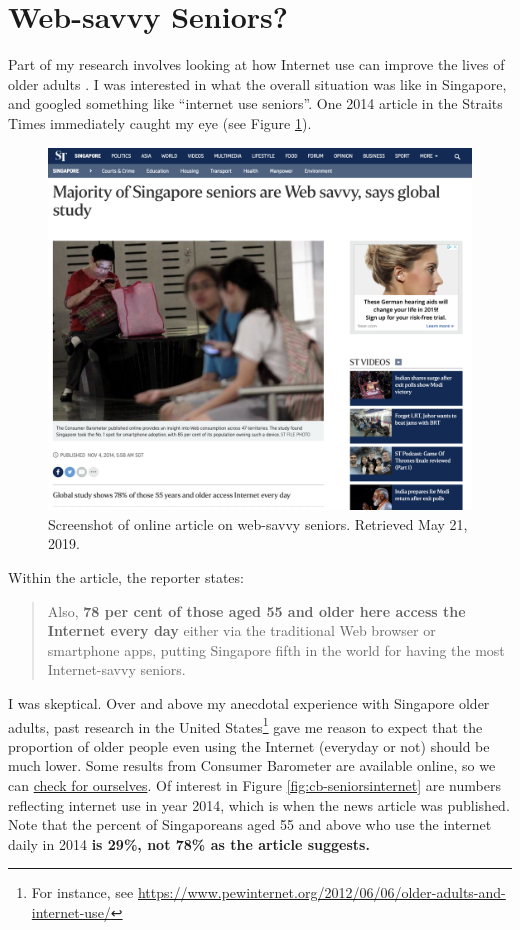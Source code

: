 \documentclass[openany]{book}
\let\rmarkdownfootnote\footnote%
\def\footnote{\protect\rmarkdownfootnote}
\begin{document}
\section{Web-savvy Seniors?}\label{websavvy}

Part of my research involves looking at how Internet use can improve the
lives of older adults \citep[see][]{ang_going_2018}. I was interested in
what the overall situation was like in Singapore, and googled something
like ``internet use seniors''. One 2014 article in the Straits Times
immediately caught my eye (see Figure \ref{fig:st-websavvyseniors}).

\begin{figure}

{\centering \includegraphics[width=0.8\linewidth]{images/proportion/STwebsavvyseniors} 

}

\caption{Screenshot of online article on web-savvy seniors. Retrieved May 21, 2019.}\label{fig:st-websavvyseniors}
\end{figure}

Within the article, the reporter states:

\begin{quote}
Also, \textbf{78 per cent of those aged 55 and older here access the
Internet every day} either via the traditional Web browser or smartphone
apps, putting Singapore fifth in the world for having the most
Internet-savvy seniors.
\end{quote}

I was skeptical. Over and above my anecdotal experience with Singapore
older adults, past research in the United States\footnote{For instance,
  see
  \url{https://www.pewinternet.org/2012/06/06/older-adults-and-internet-use/}}
gave me reason to expect that the proportion of older people even using
the Internet (everyday or not) should be much lower. Some results from
Consumer Barometer are available online, so we can
\href{https://www.consumerbarometer.com/en/trending/?countryCode=SG\&category=TRN-AGE-55-PLUS}{check
for ourselves}. Of interest in Figure \ref{fig:cb-seniorsinternet} are
numbers reflecting internet use in year 2014, which is when the news
article was published. Note that the percent of Singaporeans aged 55 and
above who use the internet daily in 2014 \textbf{is 29\%, not 78\% as
the article suggests.}
\end{document}
